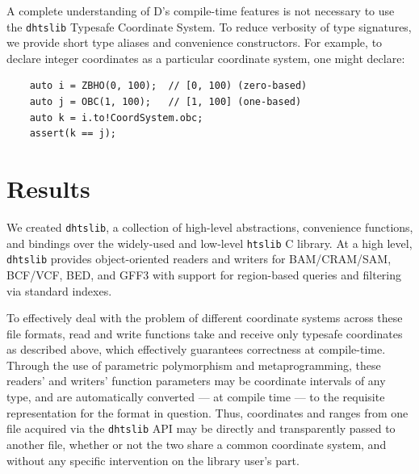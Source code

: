 \documentclass[12pt]{article}
\begin{document}
A complete understanding of D’s compile-time features is not necessary to use the \texttt{dhtslib} Typesafe Coordinate System. To reduce verbosity of type signatures, we provide short type aliases and convenience constructors. For example, to declare integer coordinates as a particular coordinate system, one might declare:

\begin{verbatim}
    auto i = ZBHO(0, 100);  // [0, 100) (zero-based)
    auto j = OBC(1, 100);   // [1, 100] (one-based)
    auto k = i.to!CoordSystem.obc;
    assert(k == j);
\end{verbatim}


\section*{Results}  %

We created \texttt{dhtslib},\cite{gregory_dhtslib_nodate} a collection of high-level abstractions, convenience functions, and bindings over the widely-used and low-level \texttt{htslib} C library.\cite{bonfield_htslib_2021} At a high level, \texttt{dhtslib} provides object-oriented readers and writers for BAM/CRAM/SAM, BCF/VCF, BED, and GFF3 with support for region-based queries and filtering via standard indexes.

To effectively deal with the problem of different coordinate systems across these file formats, read and write functions take and receive only typesafe coordinates as described above, which effectively guarantees correctness at compile-time. Through the use of parametric polymorphism and metaprogramming, these readers’ and writers’ function parameters may be coordinate intervals of any type, and are automatically converted --- at compile time --- to the requisite representation for the format in question. Thus, coordinates and ranges from one file acquired via the \texttt{dhtslib} API may be directly and transparently passed to another file, whether or not the two share a common coordinate system, and without any specific intervention on the library user's part.
\end{document}
